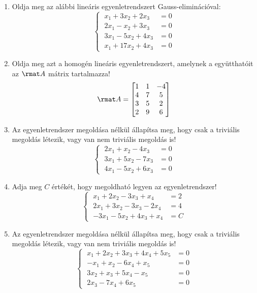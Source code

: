 \documentclass[a4paper, 12pt]{scrartcl}
\begin{document}
\begin{enumerate}
  \item Oldja meg az alábbi lineáris egyenletrendszert Gauss-eliminációval:
        $$
          \left\{\;
          \begin{aligned}
            x_1 + 3x_2 + 2x_3  & = 0 \\
            2x_1 - x_2 + 3x_3  & = 0 \\
            3x_1 - 5x_2 + 4x_3 & = 0 \\
            x_1 + 17x_2 + 4x_3 & = 0
          \end{aligned}
          \right.
        $$

  \item Oldja meg azt a homogén lineáris egyenletrendszert, amelynek a
        együtthatóit az $\rmat A$ mátrix tartalmazza!
        $$
          \rmat A =
          \begin{bmatrix}
            1 & 1 & -4 \\
            4 & 7 & 5  \\
            3 & 5 & 2  \\
            2 & 9 & 6
          \end{bmatrix}
        $$

  \item Az egyenletrendszer megoldása nélkül állapítsa meg, hogy csak a
        triviális megoldás létezik, vagy van nem triviális megoldás is!
        $$
          \left\{\;
          \begin{aligned}
            2x_1 + x_2 - 4x_3  & = 0 \\
            3x_1 + 5x_2 - 7x_3 & = 0 \\
            4x_1 - 5x_2 + 6x_3 & = 0
          \end{aligned}
          \right.
        $$

  \item Adja meg $C$ értékét, hogy megoldható legyen az egyenletrendszer!
        $$
          \left\{\;
          \begin{aligned}
            x_1 + 2x_2 - 3x_3 + x_4   & = 2 \\
            2x_1 + 3x_2 - 3x_3 - 2x_4 & = 4 \\
            -3x_1 - 5x_2 + 4x_3 + x_4 & = C
          \end{aligned}
          \right.
        $$

  \item Az egyenletrendszer megoldása nélkül állapítsa meg, hogy csak a
        triviális megoldás létezik, vagy van nem triviális megoldás is!
        $$
          \left\{\;
          \begin{aligned}
            x_1 + 2x_2 + 3x_3 + 4x_4 + 5x_5 & = 0 \\
            -x_1 + x_2 - 6x_4 + x_5         & = 0 \\
            3x_2 + x_3 + 5x_4 - x_5         & = 0 \\
            2x_3 - 7x_4 + 6x_5              & = 0
          \end{aligned}
          \right.
        $$


\end{enumerate}
\end{document}
